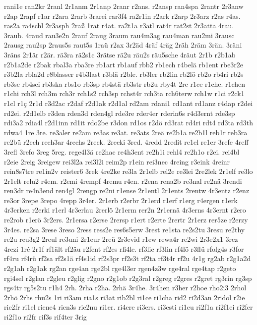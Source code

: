 {rani1e
ran2kr
2ranl
2r1anm
2r1anp
2ranr
r2ans.
r2ansp
ran4spa
2rantr
2r3anw
r2ap
2rapf
r1ar
r2ara
2rarb
3rarei
rar3f4
ra2r1in
r2ark
r2arp
2r3arz
r2as
r4as.
ras2a
ra4schl
2r3asph
2raß
1rat
r4at.
ra2t1a
r3atl
rat4r
rat2st
2r3atta
4rau.
3raub.
4raud
rau3e2n
2rauf
2raug
3raum
rau4m3ag
rau4man
rau2mi
3rausc
2rausg
rau2sp
2raus5s
raut5s
1raü
r2ax
3r2äd
4räf
4räg
2räh
2räm
3rän.
3räni
3räns
2r1är
r2är.
rä3ra
rä2s1c
3rätse
rä2u
räu2s
räu5sche
4räut
2r1b
r2b1ab
r2b1a2de
r2bak
rbal3a
rba3re
rb1art
rb1auf
rbb2
rb1ech
r4belä
rb1ent
rbe3r2e
r3b2la
rbla2d
r8blasser
r4b3last
r3blä
r2ble.
rb3ler
rb2lin
rb2lö
rb2o
rb4ri
rb2s
rb3se
rb4sei
rb3ska
rbs1o
rb3sp
rb4stä
rb3str
rb2u
rby4t
2rc
r1ce
r1che.
r1chen
r1chi
rch3l
rch3m
rch3r
rch1s2
rch3sp
rchst4r
rch3ta
rch6terw
rch1w
r1ci
r2ck1
r1cl
r1ç
2r1d
r3d2ac
r2daf
r2d1ak
r2d1al
rd2am
rdani1
rd1ant
rd1anz
r4dap
r2dei
rd2ei.
r2d1elb
r3den
rden3d
rden4gl
rde3re
rder4er
rderin6s
r4d3ernt
rde3sp
rdi3a2
rdia4l
r2d1inn
rd1it
rdo2be
r3don
rd1os
r2dö
rd3rat
rd4ri
rdt4
rd3ta
rd3th
rdwa4
1re
3re.
re3aler
re2am
re3as
re3at.
re3ats
2reä
re2b1a
re2b1l
reb1r
reb3ra
re2bü
r2ech
rech3ar
4rechs
2reck.
2recki
3red.
4redd
2redit
re1el
re1er
3refe
4reff
3refl
3refo
3reg
5reg.
rege4l3ä
re2hac
re4h3ent
re2h1i
rehl4
re2h1o
r2ei.
rei4bl
r2eie
2reig
3reigew
rei3l2a
rei3l2i
reim2p
r1ein
rei3nec
4reing
r3eink
4reinr
rein8s7tre
re1in2v
reister6
3rek
4re2ke
re3la
2r1elb
rel2e
re3lei
2re2lek
2r1elf
re3lo
2r1elt
relu2
r4em.
r2emi
4rempf
4remu
r4en.
r2ena
rena2b
re3nal
re2nä
3rendi
ren3dr
re4n3end
ren4gl
2rengp
re2ni
r1ense
2r1entl
2r1ents
2rentw
4r3entz
r2enz
re3or
3repe
3repo
4repp
3r4er.
2r1erb
r2erbr
2r1erd
r1erf
r1erg
r4ergen
r1erk
4r3erken
r2erki
r1erl
4r3erlau
2rerlö
2r1erm
rer2n
2r1ernä
4r3erns
4r3ernt
r2ero
re2rob
r1erö
3r2ers.
2r1ersa
r2erse
2rersp
r1ert
r2erte
2rertr
2r1erz
rer5ze
r2erzy
3r4es.
re2sa
3rese
3reso
2ress
ress2e
res6s5erw
3rest
re1sta
re2s2tu
3resu
re2thy
re2u
reu3g2
2reul
re3uni
2r1eur
2reü
2r3evid
r1ew
rewa4r
re2wi
2r3e2x1
3rez
4rezi
1ré
2r1f
rf1ält
rf2äu
r2fent
rf2es
rfi4le.
rf3lic
rf3lin
rf4lö
r3flü
rfolg4s
r3for
rf4ru
rf4rü
rf2sa
rf2s1ä
rf4s1id
rf2s3pr
rf2s3t
rf2ta
rf3t4r
rf2u
4r1g
rg2ab
r2g1a2d
r2g1ah
r2g1ak
rg2an
rge4an
rge2bl
rge4l3er
rgen4z3w
rge4ral
rge4tap
r2geto
rgi4sel
r2glan
r2gleu
r2glig
r2gno
r2g1ob
r2g3ral
r2greg
r2gres
r2gret
rg3rin
rg3sp
rgs4tr
rg5s2tu
r1h4
2rh.
2rha
r2ha.
2rhä
3r4he.
3r4hen
r3her
r2hoe
rho2i3
2rhol
2rhö
2rhs
rhu2s
1ri
ri3am
ria1s
ri3at
rib2bl
ri1ce
ri1cha
rid2
ri2d3an
2ridol
r2ie
rie2fr
ri1el
riene4
rien3s
rie2nu
ri1er.
ri4ere
ri3ers.
ri3esti
ri1eu
ri2f1a
ri2f1ei
ri2fer
ri2f1o
ri2fr
rif3s
rif4ter
3rig
}
